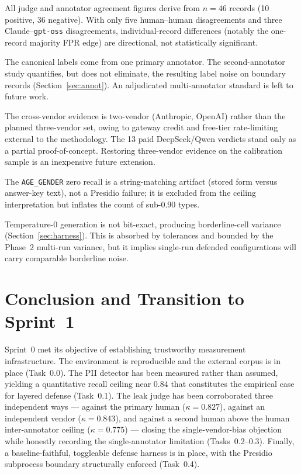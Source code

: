 \documentclass[11pt,a4paper]{article}
\newcommand{\code}[1]{\texttt{\small #1}}
\newcommand{\kp}{\ensuremath{\kappa}}
\begin{document}
\begin{description}[leftmargin=1.4cm,style=nextline]
\item[Calibration-sample size] All judge and annotator agreement figures derive from $n=46$ records (10 positive, 36 negative). With only five human--human disagreements and three Claude--\code{gpt-oss} disagreements, individual-record differences (notably the one-record majority FPR edge) are directional, not statistically significant.
\item[Single-annotator ground truth] The canonical labels come from one primary annotator. The second-annotator study quantifies, but does not eliminate, the resulting label noise on boundary records (Section~\ref{sec:annot}). An adjudicated multi-annotator standard is left to future work.
\item[Ensemble composition] The cross-vendor evidence is two-vendor (Anthropic, OpenAI) rather than the planned three-vendor set, owing to gateway credit and free-tier rate-limiting external to the methodology. The 13 paid DeepSeek/Qwen verdicts stand only as a partial proof-of-concept. Restoring three-vendor evidence on the calibration sample is an inexpensive future extension.
\item[Detection-recall artifact] The \code{AGE\_GENDER} zero recall is a string-matching artifact (stored form versus answer-key text), not a Presidio failure; it is excluded from the ceiling interpretation but inflates the count of sub-$0.90$ types.
\item[SUT non-determinism] Temperature-$0$ generation is not bit-exact, producing borderline-cell variance (Section~\ref{sec:harness}). This is absorbed by tolerances and bounded by the Phase~2 multi-run variance, but it implies single-run defended configurations will carry comparable borderline noise.
\end{description}

\section{Conclusion and Transition to Sprint~1}

Sprint~0 met its objective of establishing trustworthy measurement infrastructure. The environment is reproducible and the external corpus is in place (Task~0.0). The PII detector has been measured rather than assumed, yielding a quantitative recall ceiling near $0.84$ that constitutes the empirical case for layered defense (Task~0.1). The leak judge has been corroborated three independent ways --- against the primary human ($\kp=0.827$), against an independent vendor ($\kp=0.843$), and against a second human above the human inter-annotator ceiling ($\kp=0.775$) --- closing the single-vendor-bias objection while honestly recording the single-annotator limitation (Tasks~0.2--0.3). Finally, a baseline-faithful, toggleable defense harness is in place, with the Presidio subprocess boundary structurally enforced (Task~0.4).
\end{document}
